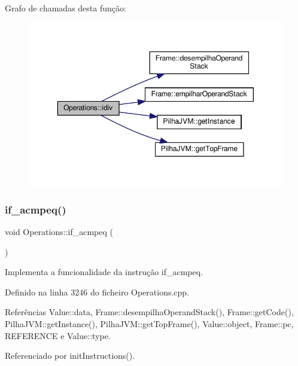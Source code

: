 Grafo de chamadas desta função\+:\nopagebreak
\begin{figure}[H]
\begin{center}
\leavevmode
\includegraphics[width=350pt]{classOperations_a5bf24c3cc02a8282c21a37cd7b7ba5d3_cgraph}
\end{center}
\end{figure}
\mbox{\label{classOperations_aa0432645b0d0effb4d4d839ea2dcec1c}} 
\subsubsection{\texorpdfstring{if\+\_\+acmpeq()}{if\_acmpeq()}}
{\footnotesize\ttfamily void Operations\+::if\+\_\+acmpeq (\begin{DoxyParamCaption}{ }\end{DoxyParamCaption})\hspace{0.3cm}{\ttfamily [private]}}



Implementa a funcionalidade da instrução if\+\_\+acmpeq. 



Definido na linha 3246 do ficheiro Operations.\+cpp.



Referências Value\+::data, Frame\+::desempilha\+Operand\+Stack(), Frame\+::get\+Code(), Pilha\+J\+V\+M\+::get\+Instance(), Pilha\+J\+V\+M\+::get\+Top\+Frame(), Value\+::object, Frame\+::pc, R\+E\+F\+E\+R\+E\+N\+CE e Value\+::type.



Referenciado por init\+Instructions().

